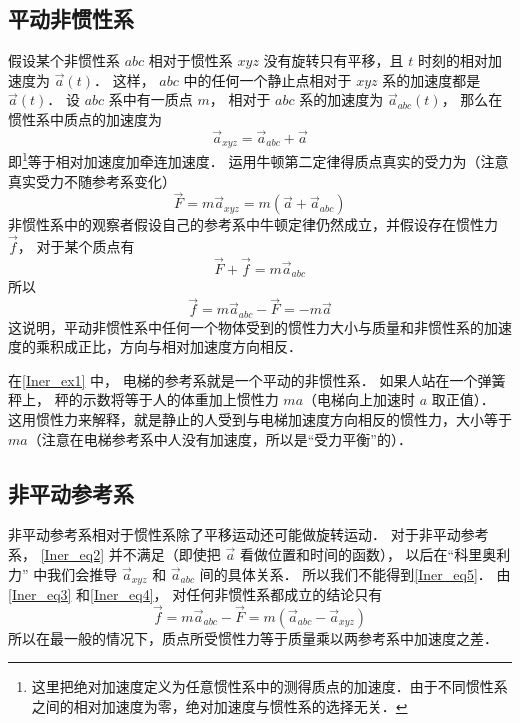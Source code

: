 \subsection{平动非惯性系}
假设某个非惯性系 $abc$ 相对于惯性系 $xyz$ 没有旋转只有平移，且 $t$ 时刻的相对加速度为 $\vec a(t)$． 这样， $abc$ 中的任何一个静止点相对于 $xyz$ 系的加速度都是 $\vec a(t)$． 设 $abc$ 系中有一质点 $m$， 相对于 $abc$ 系的加速度为 $\vec a_{abc} (t)$， 那么在惯性系中质点的加速度为
\begin{equation}\label{Iner_eq2}
\vec a_{xyz} = \vec a_{abc} + \vec a
\end{equation}
即\footnote{这里把绝对加速度定义为任意惯性系中的测得质点的加速度．由于不同惯性系之间的相对加速度为零，绝对加速度与惯性系的选择无关．}等于相对加速度加牵连加速度． 运用牛顿第二定律得质点真实的受力为（注意真实受力不随参考系变化）
\begin{equation}\label{Iner_eq3}
\vec F = m \vec a_{xyz} = m(\vec a + \vec a_{abc} )
\end{equation}
非惯性系中的观察者假设自己的参考系中牛顿定律仍然成立，并假设存在惯性力 $\vec f$， 对于某个质点有
\begin{equation}\label{Iner_eq4}
\vec F + \vec f = m \vec a_{abc}
\end{equation}
所以
\begin{equation}\label{Iner_eq5}
\vec f = m \vec a_{abc} - \vec F =  - m\vec a
\end{equation}
这说明，平动非惯性系中任何一个物体受到的惯性力大小与质量和非惯性系的加速度的乘积成正比，方向与相对加速度方向相反．

在\autoref{Iner_ex1} 中， 电梯的参考系就是一个平动的非惯性系． 如果人站在一个弹簧秤上， 秤的示数将等于人的体重加上惯性力 $ma$（电梯向上加速时 $a$ 取正值）． 这用惯性力来解释，就是静止的人受到与电梯加速度方向相反的惯性力，大小等于 $ma$（注意在电梯参考系中人没有加速度，所以是“受力平衡”的）．

\subsection{非平动参考系}

非平动参考系相对于惯性系除了平移运动还可能做旋转运动． 对于非平动参考系， \autoref{Iner_eq2} 并不满足（即使把 $\vec a$ 看做位置和时间的函数）， 以后在“科里奥利力” 中我们会推导 $\vec a_{xyz}$ 和 $\vec a_{abc}$ 间的具体关系． 所以我们不能得到\autoref{Iner_eq5}． 由\autoref{Iner_eq3} 和\autoref{Iner_eq4}， 对任何非惯性系都成立的结论只有
\begin{equation}
\vec f = m \vec a_{abc} - \vec F =  m( \vec a_{abc} - \vec a_{xyz})
\end{equation}
所以在最一般的情况下，质点所受惯性力等于质量乘以两参考系中加速度之差．


